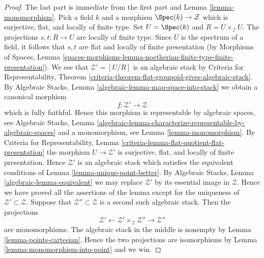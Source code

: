 \begin{proof}
The last part is immediate from the first part and
Lemma \ref{lemma-monomorphism}.
Pick a field $k$ and a morphism $\Spec(k) \to \mathcal{Z}$
which is surjective, flat, and locally of finite type.
Set $U = \Spec(k)$ and $R = U \times_\mathcal{Z} U$.
The projections $s, t : R \to U$ are locally of finite type.
Since $U$ is the spectrum of a field, it follows that
$s, t$ are flat and locally of finite presentation (by
Morphisms of Spaces, Lemma
\ref{spaces-morphisms-lemma-noetherian-finite-type-finite-presentation}).
We see that $\mathcal{Z}' = [U/R]$ is an algebraic stack by
Criteria for Representability,
Theorem \ref{criteria-theorem-flat-groupoid-gives-algebraic-stack}.
By
Algebraic Stacks, Lemma \ref{algebraic-lemma-map-space-into-stack}
we obtain a canonical morphism
$$
f : \mathcal{Z}' \longrightarrow \mathcal{Z}
$$
which is fully faithful. Hence this morphism is representable by
algebraic spaces, see
Algebraic Stacks, Lemma
\ref{algebraic-lemma-characterize-representable-by-algebraic-spaces}
and a monomorphism, see
Lemma \ref{lemma-monomorphism}.
By
Criteria for Representability,
Lemma \ref{criteria-lemma-flat-quotient-flat-presentation}
the morphism $U \to \mathcal{Z}'$ is surjective, flat, and locally of finite
presentation. Hence $\mathcal{Z}'$ is an algebraic stack which satisfies
the equivalent conditions of
Lemma \ref{lemma-unique-point-better}.
By
Algebraic Stacks, Lemma \ref{algebraic-lemma-equivalent}
we may replace $\mathcal{Z}'$ by its essential image in $\mathcal{Z}$.
Hence we have proved all the assertions of the lemma except for the
uniqueness of $\mathcal{Z}' \subset \mathcal{Z}$. Suppose that
$\mathcal{Z}'' \subset \mathcal{Z}$ is a second such algebraic stack.
Then the projections
$$
\mathcal{Z}'
\longleftarrow
\mathcal{Z}' \times_\mathcal{Z} \mathcal{Z}''
\longrightarrow
\mathcal{Z}''
$$
are monomorphisms. The algebraic stack in the middle is nonempty by
Lemma \ref{lemma-points-cartesian}.
Hence the two projections are isomorphisms by
Lemma \ref{lemma-monomorphism-into-point}
and we win.
\end{proof}

